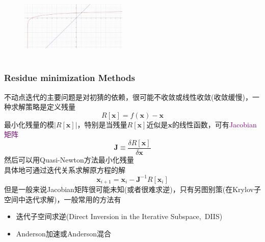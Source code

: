 {\begin{minipage}[b]{0.35\textwidth}
\end{minipage}
\hfill
\begin{minipage}[b]{0.62\textwidth}
\begin{figure}[h!]
	\vspace{-0.21in}
\centering
\includegraphics[height=1.3in,width=2.0in,viewport=0 0 2500 1600,clip]{Figures/solve_lg10.png}
\label{solution-log_10}
\end{figure}
\end{minipage}
}

\frame
{
	\frametitle{\textrm{Residue minimization Methods}}
不动点迭代的主要问题是对初猜的依赖，很可能不收敛或线性收敛(收敛缓慢)，一种求解策略是定义残量
	\begin{displaymath}
		R[\mathbf{x}]=f(\mathbf{x})-\mathbf{x}
	\end{displaymath}
	最小化残量的模$|R[\mathbf{x}]|$，特别是当残量$R[\mathbf{x}]$近似是$\mathbf{x}$的线性函数，可有\textcolor{purple}{\textrm{Jacobian}矩阵}
	\begin{displaymath}
		\mathbf{J}\equiv\dfrac{\delta R[\mathbf{x}]}{\delta\mathbf{x}}
	\end{displaymath}
	然后可以用\textrm{Quasi-Newton}方法最小化残量\\具体地可通过迭代关系求解原方程的解
	\begin{displaymath}
		\mathbf{x}_{i+1}=\mathbf{x}_{i}-\mathbf{J}^{-1}R[\mathbf{x}_{i}]
	\end{displaymath}
		但是一般来说\textrm{Jacobian}矩阵很可能未知(或者很难求逆)，只有另图别策(在\textrm{Krylov}子空间中迭代求解)，一般常用的方法有
		\begin{itemize}
			\item 迭代子空间求逆(\textrm{Direct Inversion in the Iterative Subspace,~DIIS})
			\item \textrm{Anderson}加速或\textrm{Anderson}混合
		\end{itemize}
}
	

